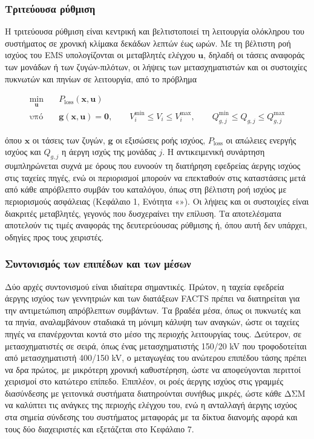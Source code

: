 \subsubsection{Τριτεύουσα ρύθμιση}

Η τριτεύουσα ρύθμιση είναι κεντρική και βελτιστοποιεί τη λειτουργία ολόκληρου του συστήματος σε
χρονική κλίμακα δεκάδων λεπτών έως ωρών. Με τη βέλτιστη ροή ισχύος του EMS υπολογίζονται οι
μεταβλητές ελέγχου $\mathbf{u}$, δηλαδή οι τάσεις αναφοράς των μονάδων ή των ζυγών-πιλότων, οι
λήψεις των μετασχηματιστών και οι συστοιχίες πυκνωτών και πηνίων σε λειτουργία, από το πρόβλημα

\begin{equation}
\begin{aligned}
\min_{\mathbf{u}} \quad & P_{\mathrm{loss}}(\mathbf{x}, \mathbf{u}) \\
\text{υπό} \quad & \mathbf{g}(\mathbf{x}, \mathbf{u}) = \mathbf{0}, \qquad
V_i^{\min} \le V_i \le V_i^{\max}, \qquad
Q_{g,j}^{\min} \le Q_{g,j} \le Q_{g,j}^{\max}
\end{aligned}
\label{eq:orpf}
\end{equation}

όπου $\mathbf{x}$ οι τάσεις των ζυγών, $\mathbf{g}$ οι εξισώσεις ροής ισχύος, $P_{\mathrm{loss}}$
οι απώλειες ενεργής ισχύος και $Q_{g,j}$ η άεργη ισχύς της μονάδας $j$. Η αντικειμενική
συνάρτηση συμπληρώνεται συχνά με όρους που ευνοούν τη διατήρηση εφεδρείας άεργης ισχύος στις
ταχείες πηγές, ενώ οι περιορισμοί μπορούν να επεκταθούν στις καταστάσεις μετά από κάθε
απρόβλεπτο συμβάν του καταλόγου, όπως στη βέλτιστη ροή ισχύος με περιορισμούς ασφάλειας
(Κεφάλαιο 1, Ενότητα «»). Οι λήψεις και οι συστοιχίες είναι διακριτές
μεταβλητές, γεγονός που δυσχεραίνει την επίλυση. Τα αποτελέσματα αποτελούν τις τιμές αναφοράς
της δευτερεύουσας ρύθμισης ή, όπου αυτή δεν υπάρχει, οδηγίες προς τους χειριστές.

\subsubsection{Συντονισμός των επιπέδων και των μέσων}

Δύο αρχές συντονισμού είναι ιδιαίτερα σημαντικές. Πρώτον, η ταχεία εφεδρεία άεργης ισχύος των
γεννητριών και των διατάξεων FACTS πρέπει να διατηρείται για την αντιμετώπιση απρόβλεπτων
συμβάντων. Τα βραδέα μέσα, όπως οι πυκνωτές και τα πηνία, αναλαμβάνουν σταδιακά τη μόνιμη
κάλυψη των αναγκών, ώστε οι ταχείες πηγές να επανέρχονται κοντά στο μέσο της περιοχής
λειτουργίας τους. Δεύτερον, σε μετασχηματιστές σε σειρά, όπως ένας μετασχηματιστής 150/20 kV
που τροφοδοτείται από μετασχηματιστή 400/150 kV, ο μεταγωγέας του ανώτερου επιπέδου τάσης πρέπει
να δρα πρώτος, με μικρότερη χρονική καθυστέρηση, ώστε να αποφεύγονται περιττοί χειρισμοί στο
κατώτερο επίπεδο. Επιπλέον, οι ροές άεργης ισχύος στις γραμμές διασύνδεσης με γειτονικά
συστήματα διατηρούνται συνήθως μικρές, ώστε κάθε ΔΣΜ να καλύπτει τις ανάγκες της περιοχής
ελέγχου του, ενώ η ανταλλαγή άεργης ισχύος στα σημεία σύνδεσης του συστήματος μεταφοράς με τα
δίκτυα διανομής αφορά και τους δύο διαχειριστές και εξετάζεται στο Κεφάλαιο 7.

